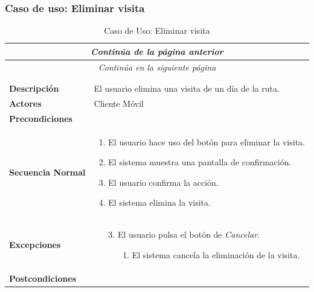 \newpage
\subsubsection*{Caso de uso: Eliminar visita }
\begin{longtable}{| p{4cm} | p{10cm} |}
\endfirsthead
\multicolumn{2}{c}{\textit{Continúa de la página anterior}}\\[12pt]
\hline
\endhead
\hline
\multicolumn{2}{c}{\textit{Continúa en la siguiente página}} \\
\endfoot
\hline
\caption{Caso de Uso: Eliminar visita}\label{fig:1}\\
\endlastfoot


\hline
\multicolumn{2}{|c|}{\textbf{CU$<$16$>$ - Eliminar Visita}} \\

\hline
\textbf{Descripción} &
El usuario elimina una visita de un día de la ruta.\\

\hline
\textbf{Actores} &
Cliente Móvil\\

\hline
\textbf{Precondiciones} &
\\

\hline
\textbf{Secuencia Normal} &\mbox{}\par\vspace{-\baselineskip}
\begin{enumerate}[leftmargin=0.7cm, topsep=0.1cm]
\item El usuario hace uso del botón para eliminar la visita.
\item El sistema muestra una pantalla de confirmación.
\item El usuario confirma la acción.
\item El sistema elimina la visita.
\end{enumerate}


\\
\hline
\textbf{Excepciones} &\mbox{}\par\vspace{-\baselineskip}
\begin{enumerate}[leftmargin=0.9cm, topsep=0.1cm]
\item[3.] El usuario pulsa el botón de \textit{Cancelar}.
	\begin{itemize}
	\item[1.] El sistema cancela la eliminación de la visita.
	\end{itemize}
\end{enumerate}
\\

\hline
\textbf{Postcondiciones} & \\
\hline
\end{longtable}



